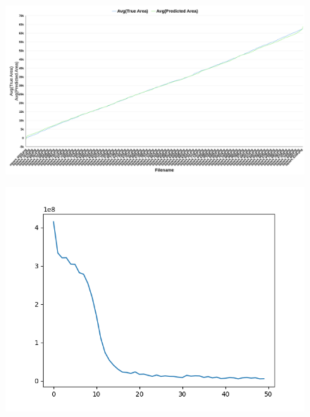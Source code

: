        
        \begin{figure}[H]
        \centering
        \includegraphics[width=1.0\linewidth]{imgs/Test_8/area_predict_true_line.png}
        \label{fig:enter-label}
    \end{figure}
    
       
        \begin{figure}[H]
        \centering
        \includegraphics[width=1.0\linewidth]{imgs/Test_8/loss.png}
 
        \label{fig:enter-label}
    \end{figure}
    

